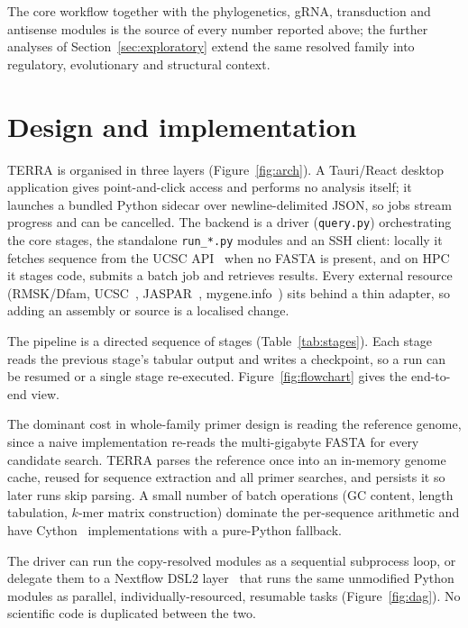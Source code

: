 \documentclass[11pt]{article}
\begin{document}
The core workflow together with the phylogenetics, gRNA, transduction and
antisense modules is the source of every number reported above; the further analyses of
Section~\ref{sec:exploratory} extend the same resolved family into regulatory, evolutionary and
structural context.

\section{Design and implementation}
\label{sec:design}

TERRA is organised in three layers (Figure~\ref{fig:arch}). A Tauri/React desktop application
gives point-and-click access and performs no analysis itself; it launches a bundled Python
sidecar over newline-delimited JSON, so jobs stream progress and can be cancelled. The backend
is a driver (\texttt{query.py}) orchestrating the core stages, the standalone
\texttt{run\_*.py} modules and an SSH client: locally it fetches sequence from the UCSC
API~\citep{kent2002ucsc} when no FASTA is present, and on HPC it stages code, submits a batch
job and retrieves results. Every external resource (RMSK/Dfam,
UCSC~\citep{kent2002ucsc}, JASPAR~\citep{castromondragon2022jaspar},
mygene.info~\citep{xin2016mygene}) sits behind a thin adapter, so adding an assembly or source
is a localised change.

The pipeline is a directed sequence of stages (Table~\ref{tab:stages}). Each stage reads the
previous stage's tabular output and writes a checkpoint, so a run can be resumed or a single
stage re-executed. Figure~\ref{fig:flowchart} gives the end-to-end view.


The dominant cost in whole-family primer design is
reading the reference genome, since a naive implementation re-reads the multi-gigabyte FASTA
for every candidate search. TERRA parses the reference once into an in-memory genome cache,
reused for sequence extraction and all primer searches, and persists it so later runs skip
parsing. A small number of batch operations (GC content, length tabulation, $k$-mer matrix
construction) dominate the per-sequence arithmetic and have Cython~\citep{behnel2011cython}
implementations with a pure-Python fallback.

The driver can run the copy-resolved modules as a sequential
subprocess loop, or delegate them to a Nextflow DSL2 layer~\citep{ditommaso2017} that runs the
same unmodified Python modules as parallel, individually-resourced, resumable tasks
(Figure~\ref{fig:dag}). No scientific code is duplicated between the two.
\end{document}
